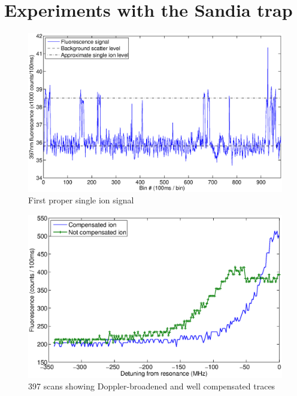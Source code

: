 \setcounter{chapter}{5} %
\chapter{Experiments with the Sandia trap}
\label{chapter:sandia}

\begin{figure}[h!t]
\centering
\includegraphics[width=14.5cm]{chapter6/firstion/firstionsign}
\caption[]{First proper single ion signal}
\label{firstionsign}
\end{figure} 



\begin{figure}[h!t]
\centering
\includegraphics[width=14.5cm]{chapter6/rfcorr/compensation397_2}
\caption[]{397 scans showing Doppler-broadened and well compensated traces}
\label{397compensationscans}
\end{figure} 


